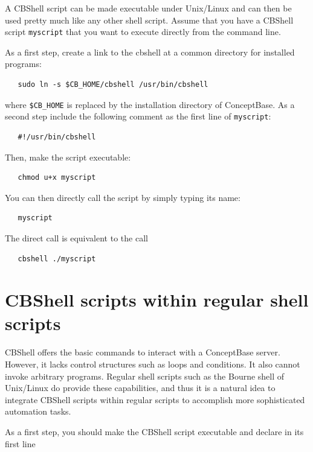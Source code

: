 A CBShell script can be made executable under Unix/Linux and can then be used pretty much like any other
shell script. Assume that you have a CBShell script {\tt myscript} that you want to execute directly from
the command line.

As a first step, create a link to the cbshell at a common directory for installed programs:

\begin{verbatim}
   sudo ln -s $CB_HOME/cbshell /usr/bin/cbshell
\end{verbatim}

where {\tt \$CB\_HOME} is replaced by the installation directory of ConceptBase.
As a second step include the following comment as the first line of {\tt myscript}:

\begin{verbatim}
   #!/usr/bin/cbshell
\end{verbatim}

Then, make the script executable:

\begin{verbatim}
   chmod u+x myscript
\end{verbatim}

You can then directly call the script by simply typing its name:

\begin{verbatim}
   myscript
\end{verbatim}

The direct call is equivalent to the call

\begin{verbatim}
   cbshell ./myscript
\end{verbatim}
 

\section{CBShell scripts within regular shell scripts}
\label{sec:shellintegration}

CBShell offers the basic commands to interact with a ConceptBase
server. However, it lacks control structures such as loops and
conditions. It also cannot invoke arbitrary programs.
Regular shell scripts such as the Bourne shell of Unix/Linux 
do provide these capabilities, and thus it is a natural idea to
integrate CBShell scripts within regular scripts to accomplish more
sophisticated automation tasks.

As a first step, you should make the CBShell script executable and declare in its first line

